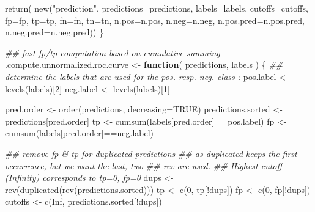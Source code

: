\documentclass[
  letterpaper,
  DIV=11,
  numbers=noendperiod]{scrartcl}
\newenvironment{Shaded}{\begin{snugshade}}{\end{snugshade}}
\newcommand{\AttributeTok}[1]{\textcolor[rgb]{0.40,0.45,0.13}{#1}}
\newcommand{\ConstantTok}[1]{\textcolor[rgb]{0.56,0.35,0.01}{#1}}
\newcommand{\ControlFlowTok}[1]{\textcolor[rgb]{0.00,0.23,0.31}{\textbf{#1}}}
\newcommand{\DecValTok}[1]{\textcolor[rgb]{0.68,0.00,0.00}{#1}}
\newcommand{\DocumentationTok}[1]{\textcolor[rgb]{0.37,0.37,0.37}{\textit{#1}}}
\newcommand{\FunctionTok}[1]{\textcolor[rgb]{0.28,0.35,0.67}{#1}}
\newcommand{\NormalTok}[1]{\textcolor[rgb]{0.00,0.23,0.31}{#1}}
\newcommand{\OtherTok}[1]{\textcolor[rgb]{0.00,0.23,0.31}{#1}}
\newcommand{\SpecialCharTok}[1]{\textcolor[rgb]{0.37,0.37,0.37}{#1}}
\newcommand{\StringTok}[1]{\textcolor[rgb]{0.13,0.47,0.30}{#1}}
\begin{document}
\begin{Shaded}
\begin{Highlighting}[]
    \FunctionTok{return}\NormalTok{( }\FunctionTok{new}\NormalTok{(}\StringTok{"prediction"}\NormalTok{, }\AttributeTok{predictions=}\NormalTok{predictions,}
                \AttributeTok{labels=}\NormalTok{labels,}
                \AttributeTok{cutoffs=}\NormalTok{cutoffs,}
                \AttributeTok{fp=}\NormalTok{fp,}
                \AttributeTok{tp=}\NormalTok{tp,}
                \AttributeTok{fn=}\NormalTok{fn,}
                \AttributeTok{tn=}\NormalTok{tn,}
                \AttributeTok{n.pos=}\NormalTok{n.pos,}
                \AttributeTok{n.neg=}\NormalTok{n.neg,}
                \AttributeTok{n.pos.pred=}\NormalTok{n.pos.pred,}
                \AttributeTok{n.neg.pred=}\NormalTok{n.neg.pred))}
\NormalTok{\}}


\DocumentationTok{\#\# fast fp/tp computation based on cumulative summing}
\NormalTok{.compute.unnormalized.roc.curve }\OtherTok{\textless{}{-}} \ControlFlowTok{function}\NormalTok{( predictions, labels ) \{}
    \DocumentationTok{\#\# determine the labels that are used for the pos. resp. neg. class :}
\NormalTok{    pos.label }\OtherTok{\textless{}{-}} \FunctionTok{levels}\NormalTok{(labels)[}\DecValTok{2}\NormalTok{]}
\NormalTok{    neg.label }\OtherTok{\textless{}{-}} \FunctionTok{levels}\NormalTok{(labels)[}\DecValTok{1}\NormalTok{]}

\NormalTok{    pred.order }\OtherTok{\textless{}{-}} \FunctionTok{order}\NormalTok{(predictions, }\AttributeTok{decreasing=}\ConstantTok{TRUE}\NormalTok{)}
\NormalTok{    predictions.sorted }\OtherTok{\textless{}{-}}\NormalTok{ predictions[pred.order]}
\NormalTok{    tp }\OtherTok{\textless{}{-}} \FunctionTok{cumsum}\NormalTok{(labels[pred.order]}\SpecialCharTok{==}\NormalTok{pos.label)}
\NormalTok{    fp }\OtherTok{\textless{}{-}} \FunctionTok{cumsum}\NormalTok{(labels[pred.order]}\SpecialCharTok{==}\NormalTok{neg.label)}

    \DocumentationTok{\#\# remove fp \& tp for duplicated predictions}
    \DocumentationTok{\#\# as duplicated keeps the first occurrence, but we want the last, two}
    \DocumentationTok{\#\# rev are used.}
    \DocumentationTok{\#\# Highest cutoff (Infinity) corresponds to tp=0, fp=0}
\NormalTok{    dups }\OtherTok{\textless{}{-}} \FunctionTok{rev}\NormalTok{(}\FunctionTok{duplicated}\NormalTok{(}\FunctionTok{rev}\NormalTok{(predictions.sorted)))}
\NormalTok{    tp }\OtherTok{\textless{}{-}} \FunctionTok{c}\NormalTok{(}\DecValTok{0}\NormalTok{, tp[}\SpecialCharTok{!}\NormalTok{dups])}
\NormalTok{    fp }\OtherTok{\textless{}{-}} \FunctionTok{c}\NormalTok{(}\DecValTok{0}\NormalTok{, fp[}\SpecialCharTok{!}\NormalTok{dups])}
\NormalTok{    cutoffs }\OtherTok{\textless{}{-}} \FunctionTok{c}\NormalTok{(}\ConstantTok{Inf}\NormalTok{, predictions.sorted[}\SpecialCharTok{!}\NormalTok{dups])}
    

\end{Highlighting}
\end{Shaded}
\end{document}
